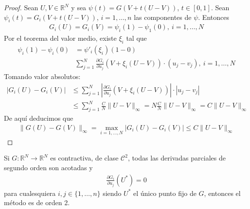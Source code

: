 \begin{proof}
    Sean $U,V \in \mathbb{R}^N$ y sea $\psi(t) = G(V +t(U-V))$, $t \in [0,1]$. Sean $\psi_i(t) = G_i(V +t(U-V))$, $i = 1,\ldots,n$ las componentes de $\psi$. Entonces
    \begin{align*}
        G_i(U) = G_i(V) = \psi_i(1) - \psi_1(0), \ i = 1,\ldots,N
    \end{align*}
    Por el teorema del valor medio, existe $\xi_i$ tal que
    \begin{align*}
        \psi_i(1) - \psi_i(0) & = \psi'_i(\xi_i)(1-0)                                                                                 \\
                              & \sum_{j=1}^{N} \frac{\partial G_i}{ \partial u_j}(V + \xi_i(U-V)) \cdot (u_j - v_j), \ i = 1,\ldots,N
    \end{align*}
    Tomando valor absolutos:
    \begin{align*}
        |G_i(U) - G_i(V)| & \leq \sum_{j=1}^{N} \left| \frac{\partial G_i}{ \partial u_j}(V + \xi_i(U-V)) \right| \cdot |u_j - v_j| \\
                          & \leq \sum_{j=1}^{N} \frac{C}{N} \|U - V\|_{\infty} = N \frac{C}{N} \|U-V\|_{\infty} = C\|U-V\|_{\infty}
    \end{align*}
    De aquí deducimos que
    \begin{align*}
        \|G(U) - G(V)\|_{\infty} = \max_{i = 1,\ldots,N} |G_i(U) - G_i(V)| \leq C \|U-V\|_{\infty}
    \end{align*}
\end{proof}

\begin{prop}
    Si $G: \mathbb{R}^N \longrightarrow \mathbb{R}^N$ es contractiva, de clase $\mathcal{C}^2$, todas las derivadas parciales de segundo orden son acotadas y
    \begin{align*}
        \frac{\partial G_i}{\partial u_j}(U^*) = 0
    \end{align*}
    para cualesquiera $i,j \in \{1,\ldots,n\}$ siendo $U^*$ el único punto fijo de $G$, entonces el método es de orden 2.
\end{prop}

